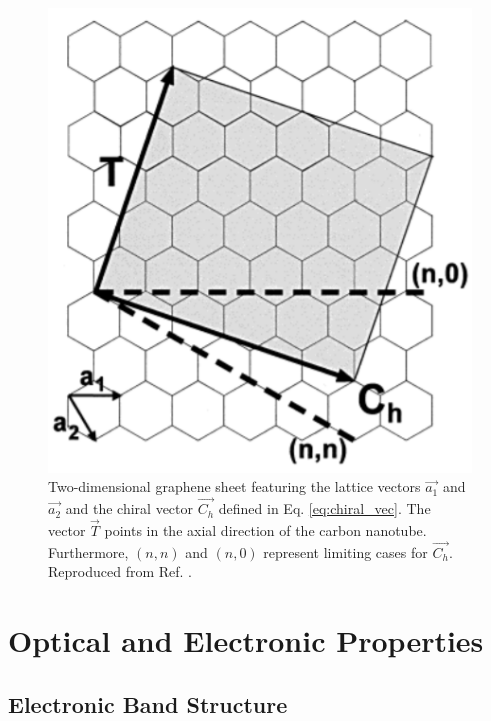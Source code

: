 \begin{figure}[ht]
	\centering
	\includegraphics[scale=1]{images/chapter_optical_props/chiral_vectors_sheet.png}
	\caption{Two-dimensional graphene sheet featuring the lattice vectors $\vec{a_1}$ and $\vec{a_2}$ and the chiral vector $\vec{C_h}$ defined in Eq. \ref{eq:chiral_vec}. The vector $\vec{T}$ points in the axial direction of the carbon nanotube. Furthermore, $(n,n)$ and $(n,0)$ represent limiting cases for $\vec{C_h }$. Reproduced from Ref. \cite{odom2000structure}.}
	\label{fig:chiral_vectors}
\end{figure}


\section{Optical and Electronic Properties}

\subsection{Electronic Band Structure}

